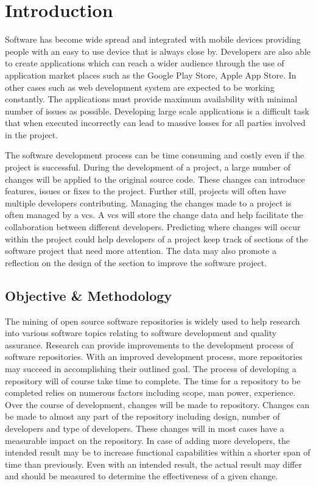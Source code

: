 \chapter{Introduction}
\label{chap:introduction}

Software has become wide spread and integrated with mobile devices providing people with an easy to use device that is always close by. Developers are also able to create applications which can reach a wider audience through the use of application market places such as the Google Play Store, Apple App Store. In other cases such as web development system are expected to be working constantly. The applications must provide maximum availability with minimal number of issues as possible. Developing large scale applications is a difficult task that when executed incorrectly can lead to massive losses for all parties involved in the project. 

The software development process can be time consuming and costly even if the project is successful. During the development of a project, a large number of changes will be applied to the original source code. These changes can introduce features, issues or fixes to the project. Further still, projects will often have multiple developers contributing. Managing the changes made to a project is often managed by a \gls{vcs}. A \gls{vcs} will store the change data and help facilitate the collaboration between different developers. Predicting where changes will occur within the project could help developers of a project keep track of sections of the software project that need more attention. The data may also promote a reflection on the design of the section to improve the software project.

\section{Objective \& Methodology}

The mining of open source software repositories is widely used to help research into various software topics relating to software development and quality assurance. Research can provide improvements to the development process of software repositories. With an improved development process, more repositories may succeed in accomplishing their outlined goal. The process of developing a repository will of course take time to complete. The time for a repository to be completed relies on numerous factors including scope, man power, experience. Over the course of development, changes will be made to repository. Changes can be made to almost any part of the repository including design, number of developers and type of developers. These changes will in most cases have a measurable impact on the repository. In case of adding more developers, the intended result may be to increase functional capabilities within a shorter span of time than previously. Even with an intended result, the actual result may differ and should be measured to determine the effectiveness of a given change.

